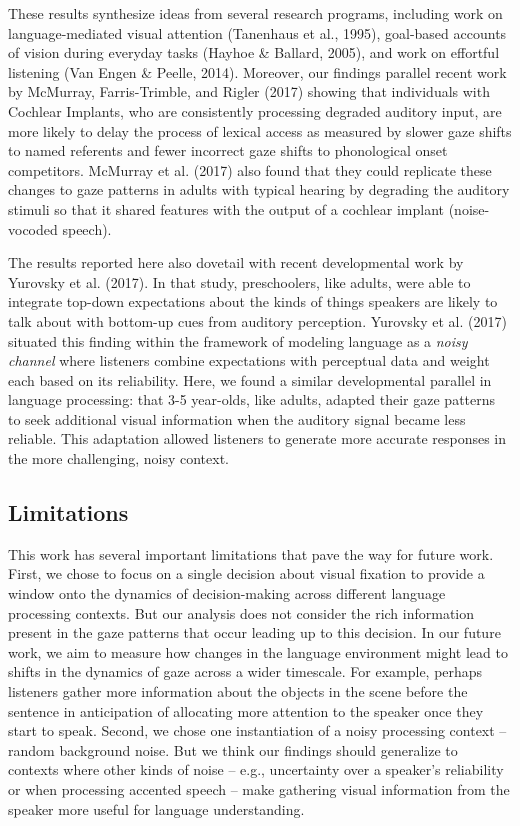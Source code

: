 \documentclass[english,man]{apa6}
\theoremstyle{definition}
\theoremstyle{definition}
\theoremstyle{definition}
\theoremstyle{remark}
\begin{document}
These results synthesize ideas from several research programs, including
work on language-mediated visual attention (Tanenhaus et al., 1995),
goal-based accounts of vision during everyday tasks (Hayhoe \& Ballard,
2005), and work on effortful listening (Van Engen \& Peelle, 2014).
Moreover, our findings parallel recent work by McMurray, Farris-Trimble,
and Rigler (2017) showing that individuals with Cochlear Implants, who
are consistently processing degraded auditory input, are more likely to
delay the process of lexical access as measured by slower gaze shifts to
named referents and fewer incorrect gaze shifts to phonological onset
competitors. McMurray et al. (2017) also found that they could replicate
these changes to gaze patterns in adults with typical hearing by
degrading the auditory stimuli so that it shared features with the
output of a cochlear implant (noise-vocoded speech).

The results reported here also dovetail with recent developmental work
by Yurovsky et al. (2017). In that study, preschoolers, like adults,
were able to integrate top-down expectations about the kinds of things
speakers are likely to talk about with bottom-up cues from auditory
perception. Yurovsky et al. (2017) situated this finding within the
framework of modeling language as a \emph{noisy channel} where listeners
combine expectations with perceptual data and weight each based on its
reliability. Here, we found a similar developmental parallel in language
processing: that 3-5 year-olds, like adults, adapted their gaze patterns
to seek additional visual information when the auditory signal became
less reliable. This adaptation allowed listeners to generate more
accurate responses in the more challenging, noisy context.

\hypertarget{limitations}{%
\subsection{Limitations}\label{limitations}}

This work has several important limitations that pave the way for future
work. First, we chose to focus on a single decision about visual
fixation to provide a window onto the dynamics of decision-making across
different language processing contexts. But our analysis does not
consider the rich information present in the gaze patterns that occur
leading up to this decision. In our future work, we aim to measure how
changes in the language environment might lead to shifts in the dynamics
of gaze across a wider timescale. For example, perhaps listeners gather
more information about the objects in the scene before the sentence in
anticipation of allocating more attention to the speaker once they start
to speak. Second, we chose one instantiation of a noisy processing
context -- random background noise. But we think our findings should
generalize to contexts where other kinds of noise -- e.g., uncertainty
over a speaker's reliability or when processing accented speech -- make
gathering visual information from the speaker more useful for language
understanding.
\end{document}
